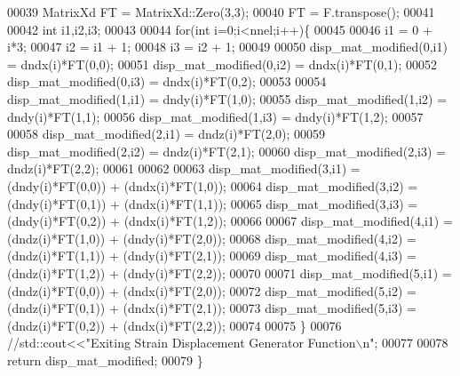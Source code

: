 \begin{DoxyCode}
00039     MatrixXd FT = MatrixXd::Zero(3,3);
00040     FT = F.transpose();
00041 
00042     \textcolor{keywordtype}{int} i1,i2,i3;
00043 
00044     \textcolor{keywordflow}{for}(\textcolor{keywordtype}{int} i=0;i<nnel;i++)\{
00045 
00046         i1 = 0 + i*3;
00047         i2 = i1 + 1;
00048         i3 = i2 + 1;
00049 
00050         disp\_mat\_modified(0,i1) = dndx(i)*FT(0,0);
00051         disp\_mat\_modified(0,i2) = dndx(i)*FT(0,1);
00052         disp\_mat\_modified(0,i3) = dndx(i)*FT(0,2);
00053 
00054         disp\_mat\_modified(1,i1) = dndy(i)*FT(1,0);
00055         disp\_mat\_modified(1,i2) = dndy(i)*FT(1,1);
00056         disp\_mat\_modified(1,i3) = dndy(i)*FT(1,2);
00057 
00058         disp\_mat\_modified(2,i1) = dndz(i)*FT(2,0);
00059         disp\_mat\_modified(2,i2) = dndz(i)*FT(2,1);
00060         disp\_mat\_modified(2,i3) = dndz(i)*FT(2,2);
00061 
00062 
00063         disp\_mat\_modified(3,i1) = (dndy(i)*FT(0,0)) + (dndx(i)*FT(1,0));
00064         disp\_mat\_modified(3,i2) = (dndy(i)*FT(0,1)) + (dndx(i)*FT(1,1));
00065         disp\_mat\_modified(3,i3) = (dndy(i)*FT(0,2)) + (dndx(i)*FT(1,2));
00066 
00067         disp\_mat\_modified(4,i1) = (dndz(i)*FT(1,0)) + (dndy(i)*FT(2,0));
00068         disp\_mat\_modified(4,i2) = (dndz(i)*FT(1,1)) + (dndy(i)*FT(2,1));
00069         disp\_mat\_modified(4,i3) = (dndz(i)*FT(1,2)) + (dndy(i)*FT(2,2));
00070 
00071         disp\_mat\_modified(5,i1) = (dndz(i)*FT(0,0)) + (dndx(i)*FT(2,0));
00072         disp\_mat\_modified(5,i2) = (dndz(i)*FT(0,1)) + (dndx(i)*FT(2,1));
00073         disp\_mat\_modified(5,i3) = (dndz(i)*FT(0,2)) + (dndx(i)*FT(2,2));
00074 
00075     \}
00076     \textcolor{comment}{//std::cout<<"Exiting Strain Displacement Generator Function\(\backslash\)n";}
00077 
00078     \textcolor{keywordflow}{return} disp\_mat\_modified;
00079 \}
\end{DoxyCode}
